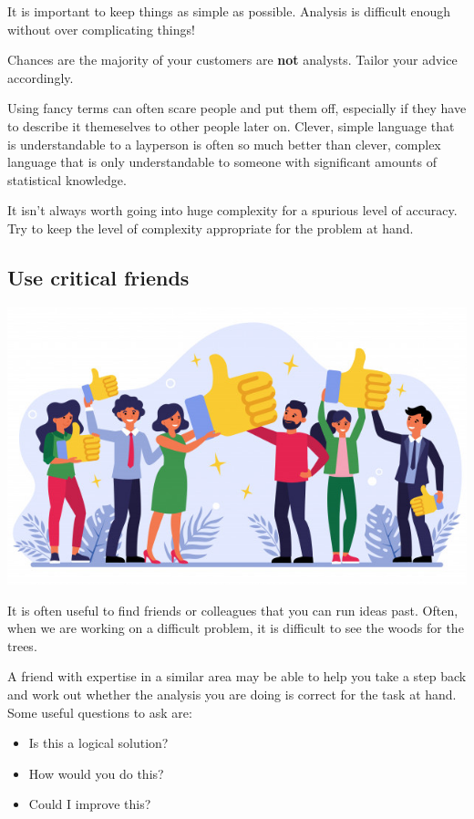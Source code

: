 \documentclass[
]{article}
\begin{document}
It is important to keep things as simple as possible. Analysis is difficult enough without over complicating things!

Chances are the majority of your customers are \textbf{not} analysts. Tailor your advice accordingly.

Using fancy terms can often scare people and put them off, especially if they have to describe it themeselves to other people later on. Clever, simple language that is understandable to a layperson is often so much better than clever, complex language that is only understandable to someone with significant amounts of statistical knowledge.

It isn't always worth going into huge complexity for a spurious level of accuracy. Try to keep the level of complexity appropriate for the problem at hand.

\hypertarget{use-critical-friends}{%
\subsection{Use critical friends}\label{use-critical-friends}}

\includegraphics{pictures/friends_pic.jpg}

It is often useful to find friends or colleagues that you can run ideas past. Often, when we are working on a difficult problem, it is difficult to see the woods for the trees.

A friend with expertise in a similar area may be able to help you take a step back and work out whether the analysis you are doing is correct for the task at hand. Some useful questions to ask are:

\begin{itemize}
\item
  Is this a logical solution?
\item
  How would you do this?
\item
  Could I improve this?
\end{itemize}
\end{document}
